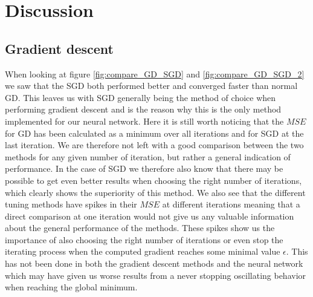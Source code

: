 \documentclass[11pt]{article}
\begin{document}
\section{Discussion}
\subsection{Gradient descent}
When looking at figure \ref{fig:compare_GD_SGD} and \ref{fig:compare_GD_SGD_2} we saw that the SGD both performed better and converged faster than normal GD. This leaves us with SGD generally being the method of choice when performing gradient descent and is the reason why this is the only method implemented for our neural network. Here it is still worth noticing that the $MSE$ for GD has been calculated as a minimum over all iterations and for SGD at the last iteration. We are therefore not left with a good comparison between the two methods for any given number of iteration, but rather a general indication of performance. In the case of SGD we therefore also know that there may be possible to get even better results when choosing the right number of iterations, which clearly shows the superiority of this method.
We also see that the different tuning methods have spikes in their $MSE$ at different iterations meaning that a direct comparison at one iteration would not give us any valuable information about the general performance of the methods. These spikes show us the importance of also choosing the right number of iterations or even stop the iterating process when the computed gradient reaches some minimal value $\epsilon$. This has not been done in both the gradient descent methods and the neural network which may have given us worse results from a never stopping oscillating behavior when reaching the global minimum.
\end{document}
